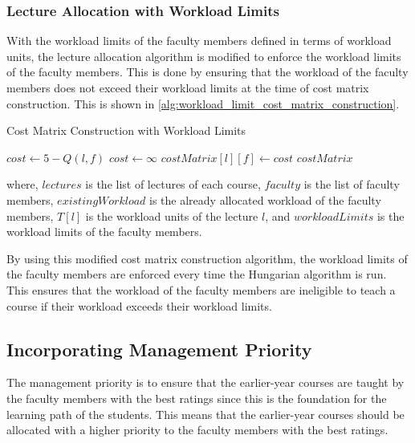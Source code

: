 \subsubsection{Lecture Allocation with Workload Limits}

With the workload limits of the faculty members defined in terms of workload units, the lecture allocation algorithm is modified to enforce the workload limits of the faculty members. This is done by ensuring that the workload of the faculty members does not exceed their workload limits at the time of cost matrix construction. This is shown in \autoref{alg:workload_limit_cost_matrix_construction}.

\begin{algorithm}[H]
  \caption{Cost Matrix Construction with Workload Limits}
  \begin{algorithmic}[1]
    \State $cost \gets 5 - Q(l, f)$
    \Else
    \State $cost \gets \infty$
    \EndIf
    \State $costMatrix[l][f] \gets cost$
    \EndFor
    \EndFor
    \Return $costMatrix$
    \EndProcedure
  \end{algorithmic}
  \label{alg:workload_limit_cost_matrix_construction}
\end{algorithm}

where, \(lectures\) is the list of lectures of each course, \(faculty\) is the list of faculty members, \(existingWorkload\) is the already allocated workload of the faculty members, \(T[l]\) is the workload units of the lecture \(l\), and \(workloadLimits\) is the workload limits of the faculty members.

By using this modified cost matrix construction algorithm, the workload limits of the faculty members are enforced every time the Hungarian algorithm is run. This ensures that the workload of the faculty members are ineligible to teach a course if their workload exceeds their workload limits.

\subsection{Incorporating Management Priority}

The management priority is to ensure that the earlier-year courses are taught by the faculty members with the best ratings since this is the foundation for the learning path of the students. This means that the earlier-year courses should be allocated with a higher priority to the faculty members with the best ratings.

